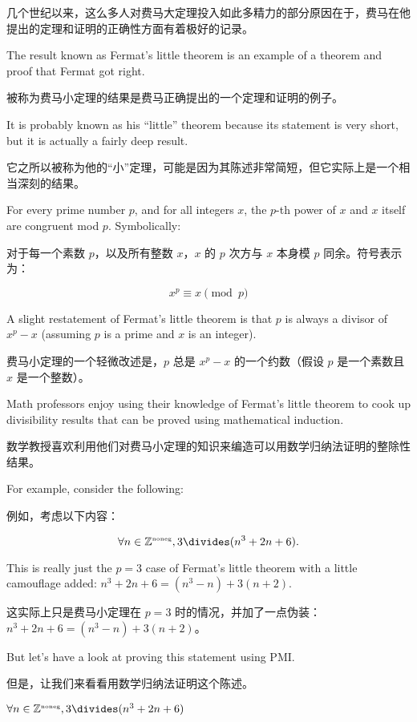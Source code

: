 几个世纪以来，这么多人对费马大定理投入如此多精力的部分原因在于，费马在他提出的定理和证明的正确性方面有着极好的记录。

The result known as Fermat's
little theorem is an example of a theorem and proof that Fermat got 
right.

被称为费马小定理的结果是费马正确提出的一个定理和证明的例子。

It is probably known as his ``little'' theorem because its 
statement is very short, but it is actually a fairly deep result.

它之所以被称为他的“小”定理，可能是因为其陈述非常简短，但它实际上是一个相当深刻的结果。

\begin{thm} 
For every prime number $p$, and for all integers $x$, the $p$-th 
power of $x$ and $x$ itself are congruent mod $p$.
Symbolically:

对于每一个素数 $p$，以及所有整数 $x$，$x$ 的 $p$ 次方与 $x$ 本身模 $p$ 同余。符号表示为：

\[ x^p \equiv x \pmod{p} \]
\end{thm}

A slight restatement of Fermat's little theorem is that $p$ is
always a divisor of $x^p-x$ (assuming $p$ is a prime and $x$ is an integer).

费马小定理的一个轻微改述是，$p$ 总是 $x^p-x$ 的一个约数（假设 $p$ 是一个素数且 $x$ 是一个整数）。

Math professors enjoy using their knowledge of Fermat's little theorem
to cook up divisibility results that can be proved using mathematical
induction.

数学教授喜欢利用他们对费马小定理的知识来编造可以用数学归纳法证明的整除性结果。

For example, consider the following:

例如，考虑以下内容：

\[ \forall n \in \Naturals,  3 \divides (n^3 + 2n + 6).
\]  

This is really just the $p=3$ case of Fermat's little theorem 
with a little camouflage added: $n^3 + 2n + 6 = (n^3-n)+3(n+2)$.

这实际上只是费马小定理在 $p=3$ 时的情况，并加了一点伪装：$n^3 + 2n + 6 = (n^3-n)+3(n+2)$。

But let's have a look at proving this statement using PMI.

但是，让我们来看看用数学归纳法证明这个陈述。

\begin{thm} 
$\forall n \in \Naturals,  3 \divides (n^3 + 2n + 6)$
\end{thm}

